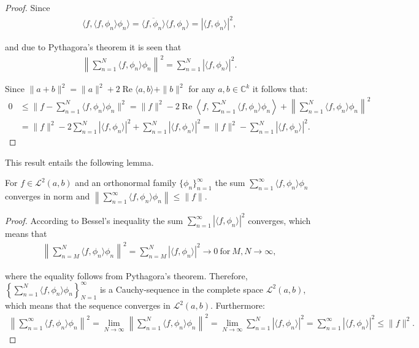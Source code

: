 \begin{proof}
Since
\begin{align*}
\langle f, \langle f,\phi_n \rangle \phi_n \rangle = \overline{\langle f,\phi_n \rangle} \langle f,\phi_n \rangle = |\langle f, \phi_n \rangle|^2,
\end{align*}

and due to Pythagora's theorem it is seen that
\begin{align*}
\left\|\sum_{n=1}^N \langle f, \phi_n \rangle \phi_n \right\|^2 = \sum_{n=1}^N |\langle f, \phi_n \rangle |^2.
\end{align*}

Since $\|a + b\|^2 = \|a\|^2 + 2 \operatorname{Re} \langle a,b  \rangle + \|b\|^2$ for any $a,b \in \mathbb{C}^k$ \cite{page 64, FAA} it follows that:
\begin{align*}
0 &\leq \|f - \sum_{n=1}^N \langle f, \phi_n \rangle \phi_n\|^2 = \|f\|^2 - 2\operatorname{Re} \left\langle f, \sum_{n=1}^N \langle f,\phi_n\rangle \phi_n \right\rangle + \left\|\sum_{n=1}^N \langle f, \phi_n \rangle \phi_n \right\|^2 \\
&= \|f\|^2 - 2\sum_{n=1}^N |\langle f, \phi_n \rangle |^2 + \sum_{n=1}^N |\langle f, \phi_n \rangle |^2 = \|f\|^2 - \sum_{n=1}^N |\langle f, \phi_n \rangle |^2.
\end{align*}
\end{proof}

This result entails the following lemma.
\begin{lemma}
For $f \in \mathcal{L}^2(a,b)$ and an orthonormal family $\{\phi_n\}_{n=1}^\infty$ the sum $\sum_{n=1}^\infty \langle f,\phi_n \rangle \phi_n$ converges in norm and $\left\| \sum_{n=1}^\infty \langle f,\phi_n \rangle \phi_n \right\| \leq \|f\|$.
\end{lemma}

\begin{proof}
According to Bessel's inequality the sum $\sum_{n=1}^\infty | \langle f,\phi_n \rangle |^2$ converges, which means that
\begin{align*}
\left\|\sum_{n=M}^N \langle f, \phi_n \rangle \phi_n \right\|^2 = \sum_{n=M}^N |\langle f, \phi_n \rangle |^2 \to 0 \ \text{for} \ M,N \to \infty,
\end{align*}

where the equality follows from Pythagora's theorem. Therefore, $\left\{ \sum_{n=1}^N \langle f,\phi_n \rangle \phi_n \right\}_{N=1}^\infty$ is a Cauchy-sequence in the complete space $\mathcal{L}^2(a,b)$, which means that the sequence converges in $\mathcal{L}^2(a,b)$. Furthermore:
\begin{align*}
\left\|\sum_{n=1}^\infty \langle f, \phi_n \rangle \phi_n \right\|^2 = \lim_{N\to \infty} \left\|\sum_{n=1}^N \langle f, \phi_n \rangle \phi_n \right\|^2 = \lim_{N\to\infty} \sum_{n=1}^N | \langle f,\phi_n \rangle |^2 = \sum_{n=1}^\infty | \langle f,\phi_n \rangle |^2 \leq \|f\|^2.
\end{align*}
\end{proof}


